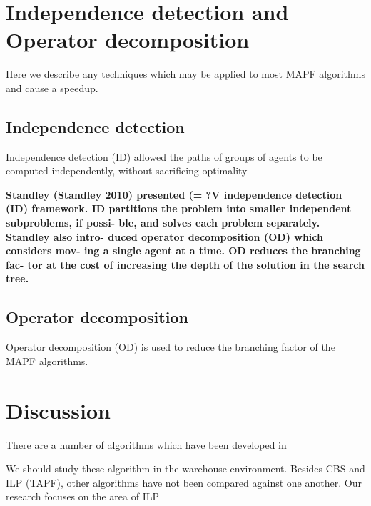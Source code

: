 \documentclass[a4paper,11pt]{article}
\begin{document}
\section{Independence detection and Operator decomposition}
Here we describe any techniques which may be applied to most MAPF algorithms and cause a speedup.

\subsection{Independence detection} \label{sec:id}
\cite{standley2010finding} Independence detection (ID) allowed the paths of groups of agents to be computed independently, without sacrificing optimality 

\textbf{Standley (Standley 2010) presented (= ?V independence detection (ID) framework. ID partitions
the problem into smaller independent subproblems, if possi- ble, and solves each problem separately. Standley also intro- duced operator decomposition (OD) which considers mov- ing a single agent at a time. OD reduces the branching fac- tor at the cost of increasing the depth of the solution in the search tree.}

\subsection{Operator decomposition} \label{sec:od}
\cite{standley2010finding} Operator decomposition (OD) is used to reduce the branching factor of the MAPF algorithms.

\section{Discussion}
There are a number of algorithms which have been developed in

We should study these algorithm in the warehouse environment. Besides CBS and ILP (TAPF), other algorithms have not been compared against one another. Our research focuses on the area of ILP
\end{document}

